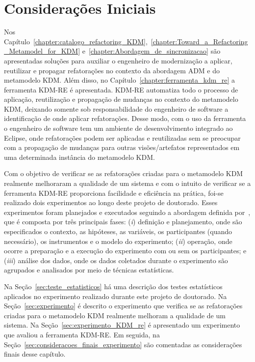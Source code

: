 \section{Considerações Iniciais}

Nos Capítulo~\ref{chapter:catalogo_refactoring_KDM},~\ref{chapter:Toward_a_Refactoring_Metamodel_for_KDM} e~\ref{chapter:Abordagem_de_sincronizacao} são apresentadas soluções para auxiliar o engenheiro de modernização a aplicar, reutilizar e propagar refatorações no contexto da abordagem ADM e do metamodelo KDM. Além disso, no Capítulo~\ref{chapter:ferramenta_kdm_re} a ferramenta KDM-RE é apresentada. KDM-RE automatiza todo o processo de aplicação, reutilização e propagação de mudanças no contexto do metamodelo KDM, deixando somente sob responsabilidade do engenheiro de software a identificação de onde aplicar refatorações. Desse modo, com o uso da ferramenta o engenheiro de software tem um ambiente de desenvolvimento integrado ao Eclipse, onde refatorações podem ser aplicadas e reutilizadas sem se preocupar com a propagação de mudanças para outras visões/artefatos representados em uma determinada instância do metamodelo KDM.

Com o objetivo de verificar se as refatorações criadas para o metamodelo KDM realmente melhoraram a qualidade de um sistema e com o intuito de verificar se a ferramenta KDM-RE proporciona facilidade e eficiência na prática, foi-se realizado dois experimentos ao longo deste projeto de doutorado. Esses experimentos foram planejados e executados seguindo a abordagem definida por~, que é composta por três principais fases: (\textit{i}) definição e planejamento, onde são especificados o contexto, as hipóteses, as variáveis, os participantes (quando necessário), os instrumentos e o modelo do experimento; (\textit{ii}) operação, onde ocorre a preparação e a execução do experimento com ou sem os participantes; e (\textit{iii}) análise dos dados, onde os dados coletados durante o experimento são agrupados e analisados por meio de técnicas estatísticas.

Na Seção~\ref{sec:teste_estatisticos} há uma descrição dos testes estatísticos aplicados no experimento realizado durante este projeto de doutorado. Na Seção~\ref{sec:experimento} é descrito o experimento que verifica se as refatorações criadas para o metamodelo KDM realmente melhoram a qualidade de um sistema. Na Seção~\ref{sec:experimento_KDM_re} é apresentado um experimento que avaliou a ferramenta KDM-RE. Em seguida, na Seção~\ref{sec:consideracoes_finais_experimento} são comentadas as considerações finais desse capítulo.

